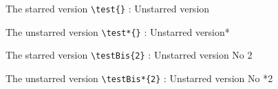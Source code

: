 \documentclass[10pt,a4paper]{article}
\newcommand\test{Unstarred version}
\newcommand\testBis[1]{Unstarred version No #1}
\begin{document}
The starred version \verb+\test{}+ : \test{}

The unstarred version \verb+\test*{}+ : \test*{}

\bigskip

The starred version \verb+\testBis{2}+ : \testBis{2}

The unstarred version \verb+\testBis*{2}+ : \testBis*{2}
\end{document}
